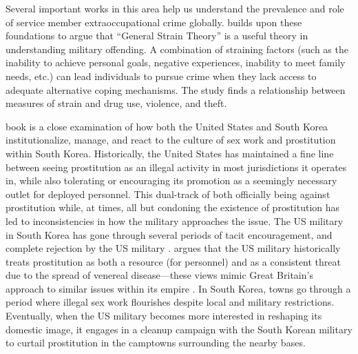 Several important works in this area help us understand the prevalence and role of service member extraoccupational crime globally.  builds upon these foundations to argue that ``General Strain Theory'' is a useful theory in understanding military offending. A combination of straining factors (such as the inability to achieve personal goals, negative experiences, inability to meet family needs, etc.) can lead individuals to pursue crime when they lack access to adequate alternative coping mechanisms. The study finds a relationship between measures of strain and drug use, violence, and theft.

 book is a close examination of how both the United States and South Korea institutionalize, manage, and react to the culture of sex work and prostitution within South Korea. Historically, the United States has maintained a fine line between seeing prostitution as an illegal activity in most jurisdictions it operates in, while also tolerating or encouraging its promotion as a seemingly necessary outlet for deployed personnel. This dual-track of both officially being against prostitution while, at times, all but condoning the existence of prostitution has led to inconsistencies in how the military approaches the issue. The US military in South Korea has gone through several periods of tacit encouragement, and complete rejection by the US military \cite{Baker2004}.  argues that the US military historically treats prostitution as both a resource (for personnel) and as a consistent threat due to the spread of venereal disease---these views mimic Great Britain's approach to similar issues within its empire \cite{Gillem2007}. In South Korea, towns go through a period where illegal sex work flourishes despite local and military restrictions. Eventually, when the US military becomes more interested in reshaping its domestic image, it engages in a cleanup campaign with the South Korean military to curtail prostitution in the camptowns surrounding the nearby bases.

